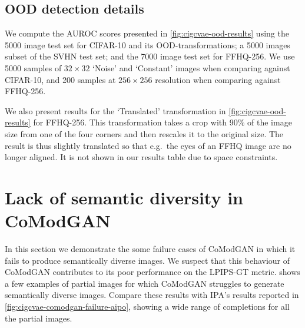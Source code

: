 \subsection{OOD detection details} We compute the AUROC scores presented in
\cref{fig:cigcvae-ood-results} using the 5000 image test set for CIFAR-10 and its
OOD-transformations; a 5000 images subset of the SVHN test set; and the 7000
image test set for FFHQ-256. We use 5000 samples of $32\times32$ `Noise' and
`Constant' images when comparing against CIFAR-10, and 200 samples at
$256\times256$ resolution when comparing against FFHQ-256.

We also present results for the `Translated' transformation in
\cref{fig:cigcvae-ood-results} for FFHQ-256. This transformation takes a crop with 90\%
of the image size from one of the four corners and then rescales it to the
original size. The result is thus slightly translated so that e.g.~the eyes of
an FFHQ image are no longer aligned. It is not shown in our results table due to
space constraints.


\section{Lack of semantic diversity in CoModGAN} \label{supp:cigcvae-comodgan-failure}
In this section we demonstrate the some failure cases of CoModGAN in which it
fails to produce semantically diverse images. We suspect that this behaviour of
CoModGAN contributes to its poor performance on the LPIPS-GT metric.
 shows a few examples of partial images for which
CoModGAN struggles to generate semantically diverse images. Compare these
results with IPA's results reported in \cref{fig:cigcvae-comodgan-failure-aipo},
showing a wide range of completions for all the partial images.

\newcommand{\cmgfailureimgheight}{0.8cm}

